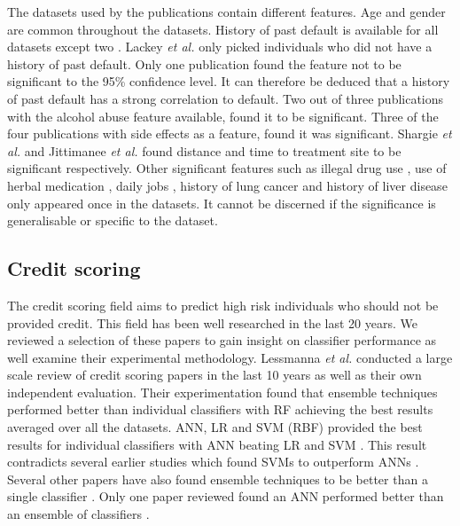 \documentclass{sig-alternate-05-2015}
\begin{document}
	The datasets used by the publications contain different features. Age and gender are common throughout the datasets. History of past default is available for all datasets except two \cite{Shargie:10.1371/journal.pmed.0040037, Lackey:10356751520150601}. Lackey \textit{et al.} \cite{Lackey:10356751520150601} only picked individuals who did not have a history of past default. Only one publication \cite{jittimanee:10.1111/j.1440-172X.2007.00650.x} found the feature not to be significant to the 95\% confidence level. It can therefore be deduced that a history of past default has a strong correlation to default. Two out of three publications with the alcohol abuse feature available, found it to be significant. Three of the four publications with side effects as a feature, found it was significant. Shargie \textit{et al.} \cite{Shargie:10.1371/journal.pmed.0040037} and Jittimanee \textit{et al.} \cite{jittimanee:10.1111/j.1440-172X.2007.00650.x} found distance and time to treatment site to be significant respectively. Other significant features such as illegal drug use \cite{Lackey:10356751520150601}, use of herbal medication \cite{muture:6660173120110101}, daily jobs \cite{jittimanee:10.1111/j.1440-172X.2007.00650.x}, history of lung cancer \cite{chan:2003prevalence} and history of liver disease \cite{chan:2003prevalence} only appeared once in the datasets. It cannot be discerned if the significance is generalisable or specific to the dataset. 
	
	\subsection{Credit scoring}
	\label{credit-scoring-review}
	The credit scoring field aims to predict high risk individuals who should not be provided credit. This field has been well researched in the last 20 years. We reviewed a selection of these papers to gain insight on classifier performance as well examine their experimental methodology. Lessmanna \textit{et al.} \cite{lessmanna2013benchmarking} conducted a large scale review of credit scoring papers in the last 10 years as well as their own independent evaluation. Their experimentation found that ensemble techniques performed better than individual classifiers with RF achieving the best results averaged over all the datasets. ANN, LR and SVM (RBF) provided the best results for individual classifiers with ANN beating LR and SVM \cite{lessmanna2013benchmarking}. This result contradicts several earlier studies which found SVMs to outperform ANNs \cite{Danenas20153194, Huang2007847, Huang2004543, Li2006772}. Several other papers have also found ensemble techniques to be better than a single classifier \cite{Hsieh2010534, Nanni20093028, Twala20103326, Wang2011223}. Only one paper reviewed found an ANN performed better than an ensemble of classifiers \cite{Tsai20082639}.
	
\end{document}
